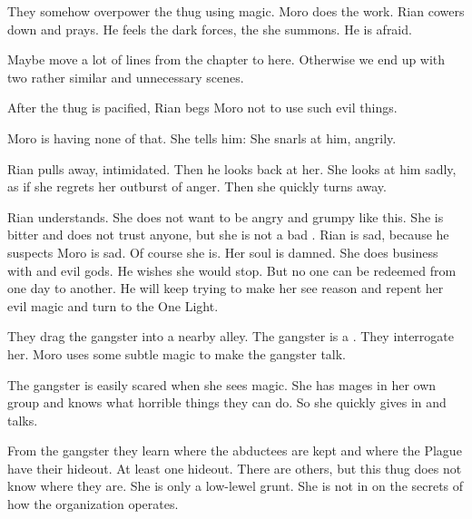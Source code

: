 \begin{comment}
  \section{Capturing the victim}
\end{comment}

They somehow overpower the thug using magic. 
Moro does the work.
Rian cowers down and prays. 
He feels the dark forces, the \daemons she summons.
He is afraid. 

Maybe move a lot of lines from the  chapter to here.
Otherwise we end up with two rather similar and unnecessary scenes. 

After the thug is pacified, Rian begs Moro not to use such evil things. 

Moro is having none of that. 
She tells him: 
She snarls at him, angrily.

Rian pulls away, intimidated.
Then he looks back at her. 
She looks at him sadly, as if she regrets her outburst of anger. 
Then she quickly turns away. 

Rian understands.
She does not want to be angry and grumpy like this.
She is bitter and does not trust anyone, but she is not a bad \scatha. 
Rian is sad, because he suspects Moro is sad. 
Of course she is.
Her soul is damned. 
She does business with \daemons and evil gods. 
He wishes she would stop.
But no one can be redeemed from one day to another. 
He will keep trying to make her see reason and repent her evil magic and turn to the One Light. 



\begin{comment}
  \section{Interrogating the victim}
\end{comment}

They drag the gangster into a nearby alley. 
The gangster is a \sphyle. 
They interrogate her. 
Moro uses some subtle magic to make the gangster talk. 

The gangster is easily scared when she sees magic.
She has mages in her own group and knows what horrible things they can do.
So she quickly gives in and talks. 

From the gangster they learn where the abductees are kept and where the Plague have their hideout.
At least one hideout. 
There are others, but this thug does not know where they are.
She is only a low-lewel grunt. 
She is not in on the secrets of how the organization operates. 


